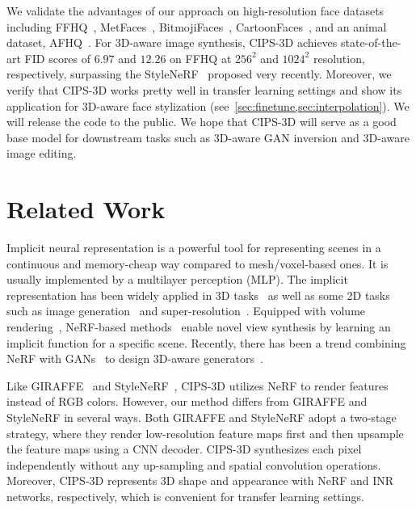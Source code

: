 \documentclass[10pt,twocolumn,letterpaper]{article}
\begin{document}
We validate the advantages of our approach on high-resolution face datasets including FFHQ~\cite{karras2019StyleBased}, MetFaces~\cite{karras2020Training}, BitmojiFaces~\cite{BitmojiFaces}, CartoonFaces~\cite{CartoonFaces}, and an animal dataset, AFHQ~\cite{choi2020StarGAN}. For 3D-aware image synthesis, CIPS-3D achieves state-of-the-art FID scores of $6.97$ and $12.26$ on FFHQ at $256^2$ and $1024^2$ resolution, respectively, surpassing the StyleNeRF~\cite{anonymous2021StyleNeRF} proposed very recently. Moreover, we verify that CIPS-3D works pretty well in transfer learning settings and show its application for 3D-aware face stylization (see~\cref{sec:finetune,sec:interpolation}). We will release the code to the public. We hope that CIPS-3D will serve as a good base model for downstream tasks such as 3D-aware GAN inversion and 3D-aware image editing.

\section{Related Work}

Implicit neural representation is a powerful tool for representing scenes in a continuous and memory-cheap way compared to mesh/voxel-based ones. It is usually implemented by a multilayer perception (MLP). The implicit representation has been widely applied in 3D tasks~\cite{chen2019Learninga,park2019DeepSDF,mescheder2019Occupancy,saito2019PIFu,littwin2019Deep,genova2019Learning,genova2020Local} as well as some 2D tasks such as image generation~\cite{skorokhodov2021Adversarial,anokhin2021Image} and super-resolution~\cite{chen2021Learning,xu2021UltraSR}. Equipped with volume rendering~\cite{kajiya1984Ray}, NeRF-based methods~\cite{mildenhall2020NeRF,martin-brualla2021NeRF,zhang2020NeRF,chen2021MVSNeRF,wang2021NeRF,barron2021MipNeRF,jang2021CodeNeRFa,yang2021Learning} enable novel view synthesis by learning an implicit function for a specific scene. Recently, there has been a trend combining NeRF with GANs~\cite{goodfellow2014Generative,arjovsky2017Wasserstein,gulrajani2017Improved,radford2015Unsupervised} to design 3D-aware generators~\cite{schwarz2020GRAF,chan2021piGAN,niemeyer2021GIRAFFE,anonymous2021StyleNeRF,niemeyer2021CAMPARI,devries2021Unconstraineda}.

Like GIRAFFE~\cite{niemeyer2021GIRAFFE} and StyleNeRF~\cite{anonymous2021StyleNeRF}, CIPS-3D utilizes NeRF to render features instead of RGB colors. However, our method differs from GIRAFFE and StyleNeRF in several ways. Both GIRAFFE and StyleNeRF adopt a two-stage strategy, where they render low-resolution feature maps first and then upsample the feature maps using a CNN decoder. CIPS-3D synthesizes each pixel independently without any up-sampling and spatial convolution operations. Moreover, CIPS-3D represents 3D shape and appearance with NeRF and INR networks, respectively, which is convenient for transfer learning settings.
\end{document}
